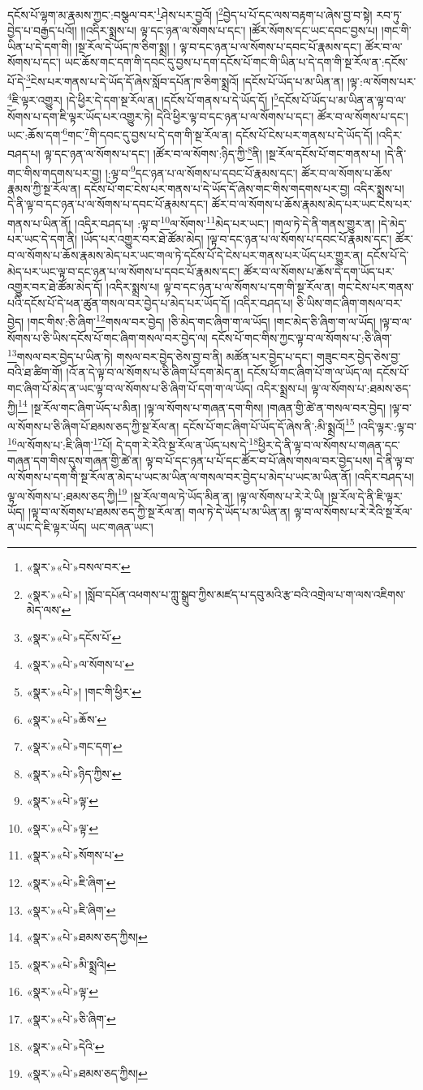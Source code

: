 དངོས་པོ་ལྷག་མ་རྣམས་ཀྱང་:བསྩལ་བར་\footnote{«སྣར་»«པེ་»བསལ་བར་}ཤེས་པར་བྱའོ། །\footnote{«སྣར་»«པེ་»། །སློབ་དཔོན་འཕགས་པ་ཀླུ་སྒྲུབ་ཀྱིས་མཛད་པ་དབུ་མའི་རྩ་བའི་འགྲེལ་པ་ག་ལས་འཇིགས་མེད་ལས་}བྱེད་པ་པོ་དང་ལས་བརྟག་པ་ཞེས་བྱ་བ་སྟེ། རབ་ཏུ་བྱེད་པ་བརྒྱད་པའོ།། །།འདིར་སྨྲས་པ། ལྟ་དང་ཉན་ལ་སོགས་པ་དང་། །ཚོར་སོགས་དང་ཡང་དབང་བྱས་པ། །གང་གི་ཡིན་པ་དེ་དག་གི། །སྔ་རོལ་དེ་ཡོད་ཁ་ཅིག་སྨྲ། །
ལྟ་བ་དང་ཉན་པ་ལ་སོགས་པ་དབང་པོ་རྣམས་དང་། ཚོར་བ་ལ་སོགས་པ་དང་། ཡང་ཆོས་གང་དག་གི་དབང་དུ་བྱས་པ་དག་དངོས་པོ་གང་གི་ཡིན་པ་དེ་དག་གི་སྔ་རོལ་ན་:དངོས་པོ་དེ་\footnote{«སྣར་»«པེ་»དངོས་པོ་}ངེས་པར་གནས་པ་དེ་ཡོད་དོ་ཞེས་སློབ་དཔོན་ཁ་ཅིག་སྨྲའོ། །དངོས་པོ་ཡོད་པ་མ་ཡིན་ན། །ལྟ་:ལ་སོགས་པར་\footnote{«སྣར་»«པེ་»ལ་སོགས་པ་}ཇི་ལྟར་འགྱུར། །དེ་ཕྱིར་དེ་དག་སྔ་རོལ་ན། །དངོས་པོ་གནས་པ་དེ་ཡོད་དོ། །\footnote{«སྣར་»«པེ་»། །གང་གི་ཕྱིར་}དངོས་པོ་ཡོད་པ་མ་ཡིན་ན་ལྟ་བ་ལ་སོགས་པ་དག་ཇི་ལྟར་ཡོད་པར་འགྱུར་ཏེ། དེའི་ཕྱིར་ལྟ་བ་དང་ཉན་པ་ལ་སོགས་པ་དང་། ཚོར་བ་ལ་སོགས་པ་དང་། ཡང་:ཆོས་དག་\footnote{«སྣར་»«པེ་»ཆོས་}གང་\footnote{«སྣར་»«པེ་»གང་དག་}གི་དབང་དུ་བྱས་པ་དེ་དག་གི་སྔ་རོལ་ན། དངོས་པོ་ངེས་པར་གནས་པ་དེ་ཡོད་དོ། །འདིར་བཤད་པ། ལྟ་དང་ཉན་ལ་སོགས་པ་དང་། །ཚོར་བ་ལ་སོགས་:ཉིད་ཀྱི་\footnote{«སྣར་»«པེ་»ཉིད་ཀྱིས་}ནི། །སྔ་རོལ་དངོས་པོ་གང་གནས་པ། །དེ་ནི་གང་གིས་གདགས་པར་བྱ། །:ལྟ་བ་\footnote{«སྣར་»«པེ་»ལྟ་}དང་ཉན་པ་ལ་སོགས་པ་དབང་པོ་རྣམས་དང་། ཚོར་བ་ལ་སོགས་པ་ཆོས་རྣམས་ཀྱི་སྔ་རོལ་ན། དངོས་པོ་གང་ངེས་པར་གནས་པ་དེ་ཡོད་དོ་ཞེས་གང་གིས་གདགས་པར་བྱ། འདིར་སྨྲས་པ། དེ་ནི་ལྟ་བ་དང་ཉན་པ་ལ་སོགས་པ་དབང་པོ་རྣམས་དང་། ཚོར་བ་ལ་སོགས་པ་ཆོས་རྣམས་མེད་པར་ཡང་ངེས་པར་གནས་པ་ཡིན་ནོ། །འདིར་བཤད་པ། :ལྟ་བ་\footnote{«སྣར་»«པེ་»ལྟ་}ལ་སོགས་\footnote{«སྣར་»«པེ་»སོགས་པ་}མེད་པར་ཡང་། །གལ་ཏེ་དེ་ནི་གནས་གྱུར་ན། །དེ་མེད་པར་ཡང་དེ་དག་ནི། །ཡོད་པར་འགྱུར་བར་ཐེ་ཚོམ་མེད། །ལྟ་བ་དང་ཉན་པ་ལ་སོགས་པ་དབང་པོ་རྣམས་དང་། ཚོར་བ་ལ་སོགས་པ་ཆོས་རྣམས་མེད་པར་ཡང་གལ་ཏེ་དངོས་པོ་དེ་ངེས་པར་གནས་པར་ཡོད་པར་གྱུར་ན། དངོས་པོ་དེ་མེད་པར་ཡང་ལྟ་བ་དང་ཉན་པ་ལ་སོགས་པ་དབང་པོ་རྣམས་དང་། ཚོར་བ་ལ་སོགས་པ་ཆོས་དེ་དག་ཡོད་པར་འགྱུར་བར་ཐེ་ཚོམ་མེད་དོ། །འདིར་སྨྲས་པ། ལྟ་བ་དང་ཉན་པ་ལ་སོགས་པ་དག་གི་སྔ་རོལ་ན། གང་ངེས་པར་གནས་པའི་དངོས་པོ་དེ་ཕན་ཚུན་གསལ་བར་བྱེད་པ་མེད་པར་ཡོད་དོ། །འདིར་བཤད་པ། ཅི་ཡིས་གང་ཞིག་གསལ་བར་བྱེད། །གང་གིས་:ཅི་ཞིག་\footnote{«སྣར་»«པེ་»ཇི་ཞིག་}གསལ་བར་བྱེད། །ཅི་མེད་གང་ཞིག་ག་ལ་ཡོད། །གང་མེད་ཅི་ཞིག་ག་ལ་ཡོད། །ལྟ་བ་ལ་སོགས་པ་ཅི་ཡིས་དངོས་པོ་གང་ཞིག་གསལ་བར་བྱེད་ལ། དངོས་པོ་གང་གིས་ཀྱང་ལྟ་བ་ལ་སོགས་པ་:ཅི་ཞིག་\footnote{«སྣར་»«པེ་»ཇི་ཞིག་}གསལ་བར་བྱེད་པ་ཡིན་ཏེ། གསལ་བར་བྱེད་ཅེས་བྱ་བ་ནི། མཚོན་པར་བྱེད་པ་དང་། གཟུང་བར་བྱེད་ཅེས་བྱ་བའི་ཐ་ཚིག་གོ། །འོ་ན་དེ་ལྟ་བ་ལ་སོགས་པ་ཅི་ཞིག་པོ་དག་མེད་ན། དངོས་པོ་གང་ཞིག་པོ་ག་ལ་ཡོད་ལ། དངོས་པོ་གང་ཞིག་པོ་མེད་ན་ཡང་ལྟ་བ་ལ་སོགས་པ་ཅི་ཞིག་པོ་དག་ག་ལ་ཡོད། འདིར་སྨྲས་པ། ལྟ་ལ་སོགས་པ་:ཐམས་ཅད་ཀྱི།\footnote{«སྣར་»«པེ་»ཐམས་ཅད་ཀྱིས།} །སྔ་རོལ་གང་ཞིག་ཡོད་པ་མིན། །ལྟ་ལ་སོགས་པ་གཞན་དག་གིས། །གཞན་གྱི་ཚེ་ན་གསལ་བར་བྱེད། །ལྟ་བ་ལ་སོགས་པ་ཅི་ཞིག་པོ་ཐམས་ཅད་ཀྱི་སྔ་རོལ་ན། དངོས་པོ་གང་ཞིག་པོ་ཡོད་དོ་ཞེས་ནི་:མི་སྨྲའོ།\footnote{«སྣར་»«པེ་»མི་སྨྲའི།} །འདི་ལྟར་:ལྟ་བ་\footnote{«སྣར་»«པེ་»ལྟ་}ལ་སོགས་པ་:ཇི་ཞིག་\footnote{«སྣར་»«པེ་»ཅི་ཞིག་}པོ། དེ་དག་རེ་རེའི་སྔ་རོལ་ན་ཡོད་པས་དེ་\footnote{«སྣར་»«པེ་»དེའི་}ཕྱིར་དེ་ནི་ལྟ་བ་ལ་སོགས་པ་གཞན་དང་གཞན་དག་གིས་དུས་གཞན་གྱི་ཚེ་ན། ལྟ་བ་པོ་དང་ཉན་པ་པོ་དང་ཚོར་བ་པོ་ཞེས་གསལ་བར་བྱེད་པས། དེ་ནི་ལྟ་བ་ལ་སོགས་པ་དག་གི་སྔ་རོལ་ན་མེད་པ་ཡང་མ་ཡིན་ལ་གསལ་བར་བྱེད་པ་མེད་པ་ཡང་མ་ཡིན་ནོ། །འདིར་བཤད་པ། ལྟ་ལ་སོགས་པ་:ཐམས་ཅད་ཀྱི།\footnote{«སྣར་»«པེ་»ཐམས་ཅད་ཀྱིས།} །སྔ་རོལ་གལ་ཏེ་ཡོད་མིན་ན། །ལྟ་ལ་སོགས་པ་རེ་རེ་ཡི། །སྔ་རོལ་དེ་ནི་ཇི་ལྟར་ཡོད། །ལྟ་བ་ལ་སོགས་པ་ཐམས་ཅད་ཀྱི་སྔ་རོལ་ན། གལ་ཏེ་དེ་ཡོད་པ་མ་ཡིན་ན། ལྟ་བ་ལ་སོགས་པ་རེ་རེའི་སྔ་རོལ་ན་ཡང་དེ་ཇི་ལྟར་ཡོད། ཡང་གཞན་ཡང་། 